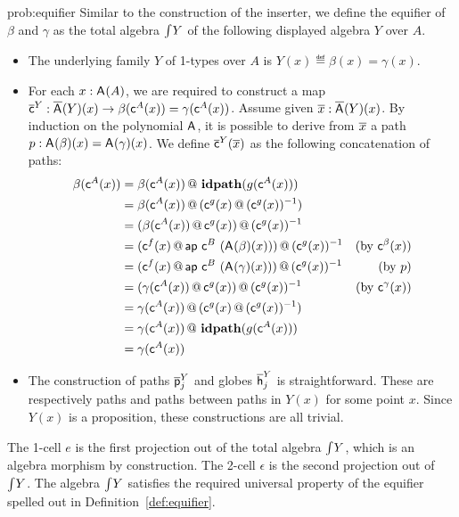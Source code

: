 \begin{construction}{prob:equifier}\label{cons:equifier}
Similar to the construction of the inserter, we define the equifier
of $\beta$ and $\gamma$ as the total algebra $\textstyle \int_{}{Y}$ of the following
displayed algebra $Y$ over $A$.
\begin{itemize}
\item The underlying family $Y$ of 1-types over $A$ is $Y(x) \eqdef \beta(x) = \gamma(x)$.
\item
For each $x : \mathsf{A}^{}(A)$, we are required to construct
a map $\overline{\mathsf{c}}^{Y} : \overline{\mathsf{A}^{}}(Y)(x) \rightarrow
\beta(\mathsf{c}^{A}(x)) = \gamma (\mathsf{c}^{A}(x))$. Assume given $\overline{x}
: \overline{\mathsf{A}^{}}(Y)(x)$. By induction on the polynomial
$\mathsf{A}^{}$, it is possible to derive from $\overline{x}$ a path $p
: \mathsf{A}^{}(\beta)(x) = \mathsf{A}^{}(\gamma)(x)$.  We
define $\overline{\mathsf{c}}^{Y}(\overline{x})$ as the following concatenation of
paths:
\begin{align*}
\beta(\mathsf{c}^{A}(x))
&= \beta(\mathsf{c}^{A}(x)) \, @ \, \operatorname{\mathbf{idpath}}(g(\mathsf{c}^{A}(x))) \\
&= \beta(\mathsf{c}^{A}(x)) \, @ \, (\mathsf{c}^{g}(x) \, @ \, (\mathsf{c}^{g}(x))^{-1}) \\
&= (\beta(\mathsf{c}^{A}(x)) \, @ \, \mathsf{c}^{g}(x)) \, @ \, (\mathsf{c}^{g}(x))^{-1} \\
&= (\mathsf{c}^{f}(x) \, @ \, \mathsf{ap} \ \mathsf{c}^{B} \ (\mathsf{A}^{}(\beta)(x))) \, @ \, (\mathsf{c}^{g}(x))^{-1}
& \text{(by $\mathsf{c}^{\beta}(x)$)}\\
&= (\mathsf{c}^{f}(x) \, @ \, \mathsf{ap} \ \mathsf{c}^{B} \ (\mathsf{A}^{}(\gamma)(x))) \, @ \, (\mathsf{c}^{g}(x))^{-1}
& \text{(by $p$)}\\
&= (\gamma(\mathsf{c}^{A}(x)) \, @ \, \mathsf{c}^{g}(x)) \, @ \, (\mathsf{c}^{g}(x))^{-1}
& \text{(by $\mathsf{c}^{\gamma}(x)$)}\\
&= \gamma(\mathsf{c}^{A}(x)) \, @ \, (\mathsf{c}^{g}(x) \, @ \, (\mathsf{c}^{g}(x))^{-1}) \\
&= \gamma(\mathsf{c}^{A}(x)) \, @ \, \operatorname{\mathbf{idpath}}(g(\mathsf{c}^{A}(x))) \\
&= \gamma(\mathsf{c}^{A}(x))
\end{align*}
\item The construction of paths $\overline{\mathsf{p}}^{Y}_{j}$ and globes $\overline{\mathsf{h}}^{Y}_{j}$ is
straightforward. These are respectively paths and paths between paths
in $Y(x)$ for some point $x$. Since $Y(x)$ is a proposition,
these constructions are all trivial.
\end{itemize}

The 1-cell $e$ is the first projection out of the total algebra $\textstyle \int_{}{Y}$, which
is an algebra morphism by construction. The 2-cell $\epsilon$ is the
second projection out of $\textstyle \int_{}{Y}$. The algebra $\textstyle \int_{}{Y}$ satisfies the required
universal property of the equifier spelled out in Definition~\ref{def:equifier}.
\end{construction}

